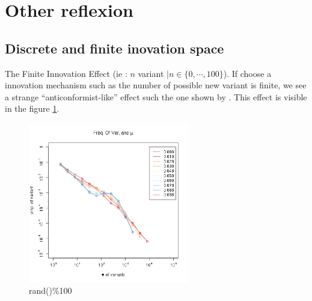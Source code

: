 \documentclass[a4paper]{article}
\begin{document}
\section{Other reflexion}
\subsection{Discrete and finite inovation space}
The Finite Innovation Effect (ie : $n$ variant  $| n\in\{0,\cdots,100\}$). If choose a innovation mechanism such as the number of possible new variant is finite, we see a strange ``anticonformist-like'' effect such the one shown by \cite{mesoudi2009randomcopyingfrequencydependencopyingandulturechange}. This effect is visible in the figure \ref{fig:finitEffect}.
\begin{figure}[h]
	\begin{center}
		\includegraphics[width=7cm]{img/allmu.png}
	\end{center}
	\caption{rand()\%100}
	\label{fig:finitEffect}
\end{figure}
\end{document}
